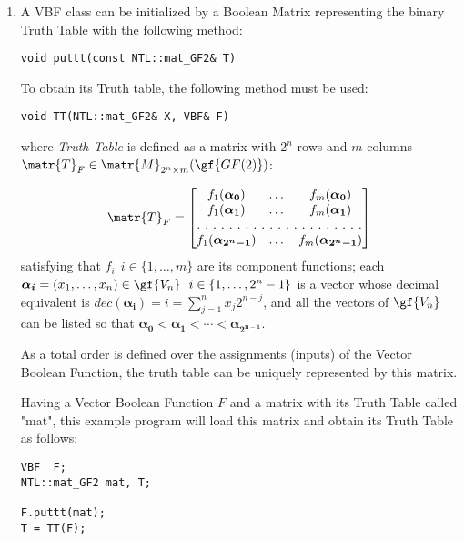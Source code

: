 \begin{enumerate}

\item A VBF class can be initialized by a Boolean Matrix representing the binary Truth Table with the following method:

\begin{verbatim}
void puttt(const NTL::mat_GF2& T)
\end{verbatim}

To obtain its Truth table, the following method must be used:

\begin{verbatim}
void TT(NTL::mat_GF2& X, VBF& F)
\end{verbatim}

where \textsl{Truth Table} is defined as a matrix with $2^n$ rows and $m$ columns $\matr{T}_F \in \matr{M}_{2^n \times m}(\gf{GF(2)})$:

\begin{equation}
\matr{T}_F = \begin{bmatrix} f_1(\boldsymbol{\alpha_0}) & \dots & f_{m}(\boldsymbol{\alpha_0}) \\
f_1(\boldsymbol{\alpha_1}) & \dots & f_{m}(\boldsymbol{\alpha_1}) \\
\hdotsfor[2]{3} \\
f_1(\boldsymbol{\alpha_{2^n-1}}) & \dots & f_{m}(\boldsymbol{\alpha_{2^n-1}}) \end{bmatrix}
\end{equation}
satisfying that $f_i \  \  i \in \{1,\dots,m\}$ are its component functions;
each $\boldsymbol{\alpha_i} = (x_1,\dots ,x_n) \in \gf{V_n} \  \  i \in
\{1,\dots,2^n-1\}$ is a vector whose decimal equivalent is
$dec(\boldsymbol{\alpha_i})=i=\sum_{j=1}^{n} x_j 2^{n-j}$, and all
the vectors of $\gf{V_n}$ can be listed so that $\boldsymbol{\alpha_0} <
\boldsymbol{\alpha_1} < \dotsb < \boldsymbol{\alpha_{2^{n-1}}}$. 

As a total order is defined over the assignments (inputs) of the Vector Boolean Function, the truth table can be uniquely represented by this matrix.

Having a Vector Boolean Function $F$ and a matrix with its Truth Table called "mat", this example program will load this matrix and obtain its Truth Table as follows:

\begin{verbatim}
VBF  F;
NTL::mat_GF2 mat, T;

F.puttt(mat);
T = TT(F);
\end{verbatim}


\end{enumerate}

